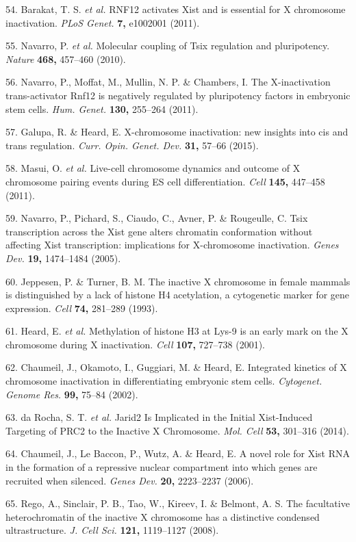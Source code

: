 \documentclass[11pt,twoside]{MPIthesis}
\theoremstyle{definition}
\theoremstyle{definition}
\theoremstyle{definition}
\theoremstyle{remark}
\begin{document}
54. Barakat, T. S. \emph{et al.} RNF12 activates Xist and is essential
for X chromosome inactivation. \emph{PLoS Genet.} \textbf{7,} e1002001
(2011).

55. Navarro, P. \emph{et al.} Molecular coupling of Tsix regulation and
pluripotency. \emph{Nature} \textbf{468,} 457--460 (2010).

56. Navarro, P., Moffat, M., Mullin, N. P. \& Chambers, I. The
X-inactivation trans-activator Rnf12 is negatively regulated by
pluripotency factors in embryonic stem cells. \emph{Hum. Genet.}
\textbf{130,} 255--264 (2011).

57. Galupa, R. \& Heard, E. X-chromosome inactivation: new insights into
cis and trans regulation. \emph{Curr. Opin. Genet. Dev.} \textbf{31,}
57--66 (2015).

58. Masui, O. \emph{et al.} Live-cell chromosome dynamics and outcome of
X chromosome pairing events during ES cell differentiation. \emph{Cell}
\textbf{145,} 447--458 (2011).

59. Navarro, P., Pichard, S., Ciaudo, C., Avner, P. \& Rougeulle, C.
Tsix transcription across the Xist gene alters chromatin conformation
without affecting Xist transcription: implications for X-chromosome
inactivation. \emph{Genes Dev.} \textbf{19,} 1474--1484 (2005).

60. Jeppesen, P. \& Turner, B. M. The inactive X chromosome in female
mammals is distinguished by a lack of histone H4 acetylation, a
cytogenetic marker for gene expression. \emph{Cell} \textbf{74,}
281--289 (1993).

61. Heard, E. \emph{et al.} Methylation of histone H3 at Lys-9 is an
early mark on the X chromosome during X inactivation. \emph{Cell}
\textbf{107,} 727--738 (2001).

62. Chaumeil, J., Okamoto, I., Guggiari, M. \& Heard, E. Integrated
kinetics of X chromosome inactivation in differentiating embryonic stem
cells. \emph{Cytogenet. Genome Res.} \textbf{99,} 75--84 (2002).

63. da Rocha, S. T. \emph{et al.} Jarid2 Is Implicated in the Initial
Xist-Induced Targeting of PRC2 to the Inactive X Chromosome. \emph{Mol.
Cell} \textbf{53,} 301--316 (2014).

64. Chaumeil, J., Le Baccon, P., Wutz, A. \& Heard, E. A novel role for
Xist RNA in the formation of a repressive nuclear compartment into which
genes are recruited when silenced. \emph{Genes Dev.} \textbf{20,}
2223--2237 (2006).

65. Rego, A., Sinclair, P. B., Tao, W., Kireev, I. \& Belmont, A. S. The
facultative heterochromatin of the inactive X chromosome has a
distinctive condensed ultrastructure. \emph{J. Cell Sci.} \textbf{121,}
1119--1127 (2008).
\end{document}
